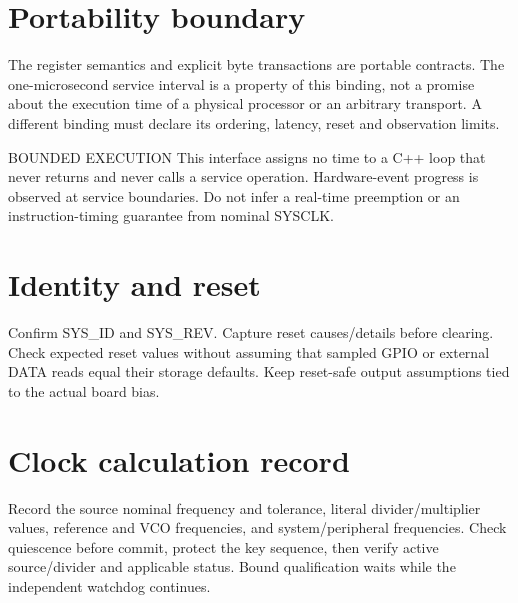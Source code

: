 \documentclass[10pt]{article}
\begin{document}
\section*{Portability boundary}
The register semantics and explicit byte transactions are portable contracts. The one-microsecond service interval is a property of this binding, not a promise about the execution time of a physical processor or an arbitrary transport. A different binding must declare its ordering, latency, reset and observation limits.
\begin{Notice}{BOUNDED EXECUTION}
This interface assigns no time to a C++ loop that never returns and never calls a service operation. Hardware-event progress is observed at service boundaries. Do not infer a real-time preemption or an instruction-timing guarantee from nominal SYSCLK.
\end{Notice}

\newpage
{}

\section*{Identity and reset}
Confirm SYS\_ID and SYS\_REV. Capture reset causes/details before clearing. Check expected reset values without assuming that sampled GPIO or external DATA reads equal their storage defaults. Keep reset-safe output assumptions tied to the actual board bias.
\section*{Clock calculation record}
Record the source nominal frequency and tolerance, literal divider/multiplier values, reference and VCO frequencies, and system/peripheral frequencies. Check quiescence before commit, protect the key sequence, then verify active source/divider and applicable status. Bound qualification waits while the independent watchdog continues.
\end{document}
